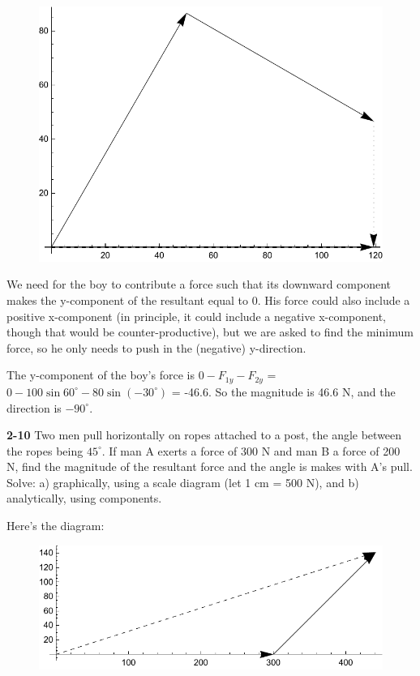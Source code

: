 \documentclass{amsart}
\begin{document}
\begin{figure}[h]
\includegraphics[scale=0.4]{2-9}
\end{figure}

We need for the boy to contribute a force such that its downward component makes the y-component
of the resultant equal to 0.  His force could also include a positive x-component
(in principle, it could include a negative x-component, though that would be counter-productive),
but we are asked to find the minimum force, so he only needs to push in the (negative) y-direction.

The y-component of the boy's force is $0 - F_{1y} - F_{2y}$ = $0 - 100 \sin 60^\circ - 80 \sin (-30^\circ)$ = -46.6.
So the magnitude is 46.6 N, and the direction is $-90^\circ$.

\vspace{\baselineskip}
\noindent
\textbf{2-10} Two men pull horizontally on ropes attached to a post,
the angle between the ropes being $45^\circ$.
If man A exerts a force of 300 N and man B a force of 200 N,
find the magnitude of the resultant force and the angle is makes with A's pull.  Solve:\newline
a) graphically, using a scale diagram (let 1 cm = 500 N), and\newline
b) analytically, using components.

Here's the diagram:

\begin{figure}[h]
\includegraphics[scale=0.4]{2-10}
\end{figure}
\end{document}
